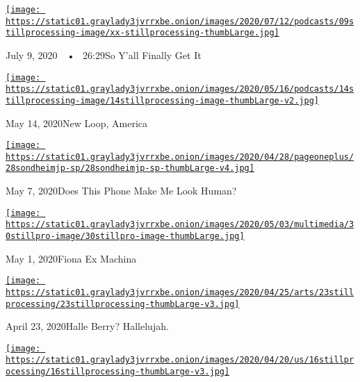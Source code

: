 \href{https://www.nytimes3xbfgragh.onion/2020/07/09/podcasts/still-processing-black-lives-matter.html?action=click\&module=audio-series-bar\&region=header\&pgtype=Article}{\texttt{[image: https://static01.graylady3jvrrxbe.onion/images/2020/07/12/podcasts/09stillprocessing-image/xx-stillprocessing-thumbLarge.jpg]}}

July 9, 2020~~•~ 26:29So Y'all Finally Get It

\href{https://www.nytimes3xbfgragh.onion/2020/05/14/podcasts/still-processing-westworld-hollywood-utopia-dystopia.html?action=click\&module=audio-series-bar\&region=header\&pgtype=Article}{\texttt{[image: https://static01.graylady3jvrrxbe.onion/images/2020/05/16/podcasts/14stillprocessing-image/14stillprocessing-image-thumbLarge-v2.jpg]}}

May 14, 2020New Loop, America

\href{https://www.nytimes3xbfgragh.onion/2020/05/07/podcasts/still-processing-internet-vulnerability-sondheim-parks-recreation.html?action=click\&module=audio-series-bar\&region=header\&pgtype=Article}{\texttt{[image: https://static01.graylady3jvrrxbe.onion/images/2020/04/28/pageoneplus/28sondheimjp-sp/28sondheimjp-sp-thumbLarge-v4.jpg]}}

May 7, 2020Does This Phone Make Me Look Human?

\href{https://www.nytimes3xbfgragh.onion/2020/04/30/podcasts/still-processing-fiona-apple-fetch-bolt-cutters.html?action=click\&module=audio-series-bar\&region=header\&pgtype=Article}{\texttt{[image: https://static01.graylady3jvrrxbe.onion/images/2020/05/03/multimedia/30stillpro-image/30stillpro-image-thumbLarge.jpg]}}

May 1, 2020Fiona Ex Machina

\href{https://www.nytimes3xbfgragh.onion/2020/04/23/podcasts/still-processing-halle-berry-sharon-stone-catwoman-quarantine.html?action=click\&module=audio-series-bar\&region=header\&pgtype=Article}{\texttt{[image: https://static01.graylady3jvrrxbe.onion/images/2020/04/25/arts/23stillprocessing/23stillprocessing-thumbLarge-v3.jpg]}}

April 23, 2020Halle Berry? Hallelujah.

\href{https://www.nytimes3xbfgragh.onion/2020/04/16/podcasts/still-processing-AIDS-survive-coronavirus.html?action=click\&module=audio-series-bar\&region=header\&pgtype=Article}{\texttt{[image: https://static01.graylady3jvrrxbe.onion/images/2020/04/20/us/16stillprocessing/16stillprocessing-thumbLarge-v3.jpg]}}


